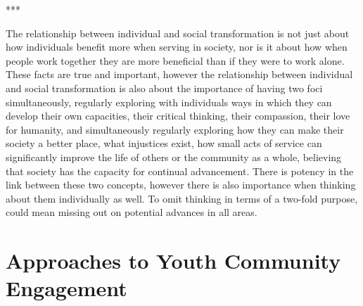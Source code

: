 






***

The relationship between individual and social transformation is not just about how individuals benefit more when serving in society, nor is it about how when people work together they are more beneficial than if they were to work alone. These facts are true and important, however the relationship between individual and social transformation is also about the importance of having two foci simultaneously, regularly exploring with individuals ways in which they can develop their own capacities, their critical thinking, their compassion, their love for humanity, and simultaneously regularly exploring how they can make their society a better place, what injustices exist, how small acts of service can significantly improve the life of others or the community as a whole, believing that society has the capacity for continual advancement. There is potency in the link between these two concepts, however there is also importance when thinking about them individually as well. To omit thinking in terms of a two-fold purpose, could mean missing out on potential advances in all areas. 




\section{Approaches to Youth Community Engagement} %

